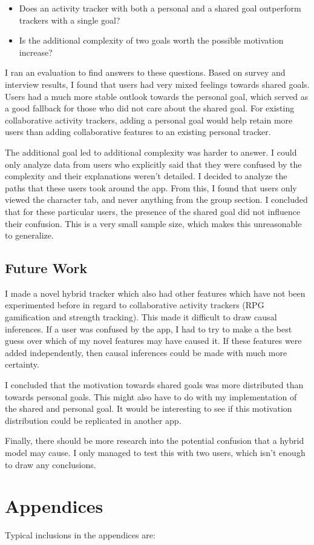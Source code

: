\documentclass{l4proj}
\begin{document}
\begin{itemize}
  \item Does an activity tracker with both a personal and a shared goal outperform trackers with a single goal?
  \item Is the additional complexity of two goals worth the possible motivation increase?
\end{itemize}

I ran an evaluation to find answers to these questions. Based on survey and interview results, I found that users had very mixed feelings towards shared goals. Users had a much more stable outlook towards the personal goal, which served as a good fallback for those who did not care about the shared goal. For existing collaborative activity trackers, adding a personal goal would help retain more users than adding collaborative features to an existing personal tracker.

The additional goal led to additional complexity was harder to answer. I could only analyze data from users who explicitly said that they were confused by the complexity and their explanations weren't detailed. I decided to analyze the paths that these users took around the app. From this, I found that users only viewed the character tab, and never anything from the group section. I concluded that for these particular users, the presence of the shared goal did not influence their confusion. This is a very small sample size, which makes this unreasonable to generalize.

\section{Future Work}
I made a novel hybrid tracker which also had other features which have not been experimented before in regard to collaborative activity trackers (RPG gamification and strength tracking). This made it difficult to draw causal inferences. If a user was confused by the app, I had to try to make a the best guess over which of my novel features may have caused it. If these features were added independently, then causal inferences could be made with much more certainty. 

I concluded that the motivation towards shared goals was more distributed than towards personal goals. This might also have to do with my implementation of the shared and personal goal. It would be interesting to see if this motivation distribution could be replicated in another app.

Finally, there should be more research into the potential confusion that a hybrid model may cause. I only managed to test this with two users, which isn't enough to draw any conclusions.





\chapter{Appendices}


Typical inclusions in the appendices are:
\end{document}

